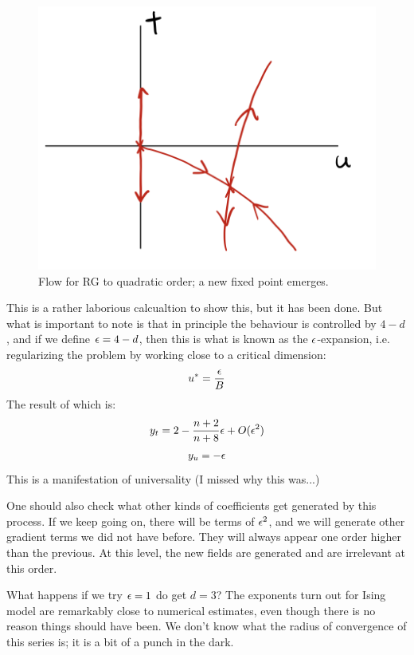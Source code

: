 \begin{figure}[htbp]
    \centering
    \includegraphics[scale=0.4]{Lectures/Figures/rgflow-quadratic.png}
    \caption{Flow for RG to quadratic order; a new fixed point emerges.}
    \label{rgflow-quadratic}
\end{figure}


This is a rather laborious calcualtion to show this, but it has been done. But what is important to note is that in principle the behaviour is controlled by $4-d$, and if we define $\epsilon = 4-d$, then this is what is known as the $\epsilon$-expansion, i.e. regularizing the problem by working close to a critical dimension:
\begin{equation}
    u^* = \frac{\epsilon}{B}
\end{equation}
The result of which is:
\begin{equation}
    y_t = 2 - \frac{n+2}{n+8}\epsilon + O(\epsilon^2)
\end{equation}
\begin{equation}
    y_u = -\epsilon
\end{equation}
This is a manifestation of universality (I missed why this was...)

One should also check what other kinds of coefficients get generated by this process. If we keep going on, there will be terms of $\epsilon^2$, and we will generate other gradient terms we did not have before. They will always appear one order higher than the previous. At this level, the new fields are generated and are irrelevant at this order.

What happens if we try $\epsilon = 1$ do get $d = 3$? The exponents turn out for Ising model are remarkably close to numerical estimates, even though there is no reason things should have been. We don't know what the radius of convergence of this series is; it is a bit of a punch in the dark. 

